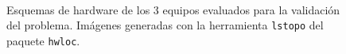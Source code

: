 \begin{figure}
\centering
\hspace*{\fill}
\hspace*{\fill}
\hspace*{\fill}
\\
\caption{Esquemas de hardware de los 3 equipos evaluados para la validación del problema. Imágenes generadas con la herramienta \texttt{lstopo} del paquete \texttt{hwloc}.}
\end{figure}

